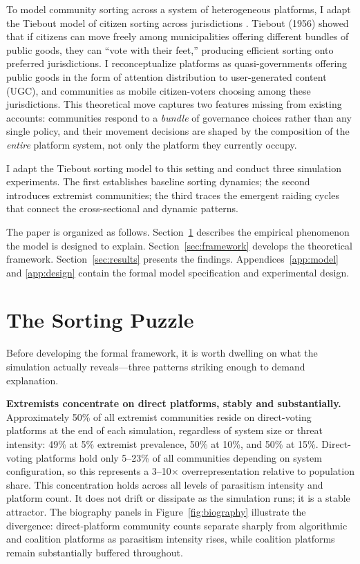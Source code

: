 \documentclass{article}
\begin{document}
To model community sorting across a system of heterogeneous platforms, I adapt the Tiebout model of citizen sorting across jurisdictions \citep{tiebout1956pure}. Tiebout (1956) showed that if citizens can move freely among municipalities offering different bundles of public goods, they can ``vote with their feet,'' producing efficient sorting onto preferred jurisdictions. I reconceptualize platforms as quasi-governments offering public goods in the form of attention distribution to user-generated content (UGC), and communities as mobile citizen-voters choosing among these jurisdictions. This theoretical move captures two features missing from existing accounts: communities respond to a \emph{bundle} of governance choices rather than any single policy, and their movement decisions are shaped by the composition of the \emph{entire} platform system, not only the platform they currently occupy.

I adapt the Tiebout sorting model to this setting and conduct three simulation experiments. The first establishes baseline sorting dynamics; the second introduces extremist communities; the third traces the emergent raiding cycles that connect the cross-sectional and dynamic patterns.

The paper is organized as follows. Section~\ref{sec:puzzle} describes the empirical phenomenon the model is designed to explain. Section~\ref{sec:framework} develops the theoretical framework. Section~\ref{sec:results} presents the findings. Appendices~\ref{app:model} and \ref{app:design} contain the formal model specification and experimental design.

\section{The Sorting Puzzle}
\label{sec:puzzle}

Before developing the formal framework, it is worth dwelling on what the simulation actually reveals---three patterns striking enough to demand explanation.

\textbf{Extremists concentrate on direct platforms, stably and substantially.} Approximately 50\% of all extremist communities reside on direct-voting platforms at the end of each simulation, regardless of system size or threat intensity: 49\% at 5\% extremist prevalence, 50\% at 10\%, and 50\% at 15\%. Direct-voting platforms hold only 5--23\% of all communities depending on system configuration, so this represents a 3--10$\times$ overrepresentation relative to population share. This concentration holds across all levels of parasitism intensity and platform count. It does not drift or dissipate as the simulation runs; it is a stable attractor. The biography panels in Figure~\ref{fig:biography} illustrate the divergence: direct-platform community counts separate sharply from algorithmic and coalition platforms as parasitism intensity rises, while coalition platforms remain substantially buffered throughout.
\end{document}
